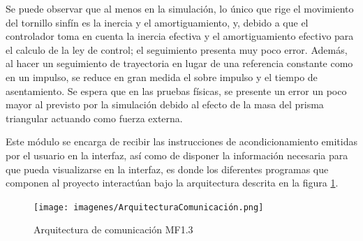 Se puede observar que al menos en la simulación, lo único que rige el movimiento del tornillo sinfín es la inercia y el amortiguamiento, y, debido a que el controlador toma en cuenta la inercia efectiva y el amortiguamiento efectivo para el calculo de la ley de control; el seguimiento presenta muy poco error. Además, al hacer un seguimiento de trayectoria en lugar de una referencia constante como en un impulso, se reduce en gran medida el sobre impulso y el tiempo de asentamiento. Se espera que en las pruebas físicas, se presente un error un poco mayor al previsto por la simulación debido al efecto de la masa del prisma triangular actuando como fuerza externa. \\


Este módulo se encarga de recibir las instrucciones de acondicionamiento emitidas por el usuario en la interfaz, así como de disponer la información necesaria para que pueda visualizarse en la interfaz, es donde los diferentes programas que componen al proyecto interactúan bajo la arquitectura descrita en la figura \ref{fig:ArquitecturaComunicacion}.\\

\begin{figure}[h]
    \centering
    \texttt{[image: imagenes/ArquitecturaComunicación.png]}
    \caption{Arquitectura de comunicación MF1.3}
    \label{fig:ArquitecturaComunicacion}
\end{figure}

